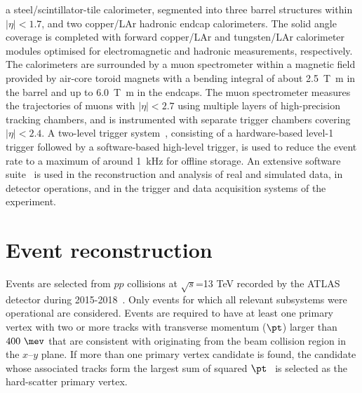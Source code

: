 \documentclass[PAPER, coverpage, atlasdraft=true, texlive=2016, UKenglish]{\ATLASLATEXPATH atlasdoc}
\providecommand{\DIFadd}[1]{{\protect\color{blue}\uwave{#1}}} %
\providecommand{\DIFaddbegin}{} %
\providecommand{\DIFaddend}{} %
\begin{document}
a steel/scintillator-tile calorimeter, segmented into three barrel structures within $|\eta| < 1.7$, and two copper/LAr hadronic endcap calorimeters.
The solid angle coverage is completed with forward copper/LAr and tungsten/LAr calorimeter modules optimised for electromagnetic and hadronic measurements, respectively.
The calorimeters are surrounded by a muon spectrometer within a magnetic field provided by air-core toroid magnets with a bending integral of about \SI{2.5}{\tesla\metre} in the barrel and up to \SI{6.0}{\tesla\metre} in the endcaps. 
The muon spectrometer measures the trajectories of muons with $|\eta|<2.7$ using multiple layers of high-precision tracking chambers, and \DIFaddbegin \DIFadd{it }\DIFaddend is instrumented with separate trigger chambers covering $|\eta|<2.4$. A two-level trigger system~\cite{Aaboud:2016leb}, consisting of a hardware-based level-1 trigger followed by a software-based high-level trigger, is used to reduce the event rate to a maximum of around \SI{1}{\kHz} for offline storage.
An extensive software suite~\cite{ATL-SOFT-PUB-2021-001} is used in the reconstruction and analysis of real and simulated data, in detector operations, and in the trigger and data acquisition systems of the experiment.


\section{Event reconstruction}
\label{sec:objects}

Events are selected from $pp$ collisions at $\sqrt{s}$=13 TeV recorded by the ATLAS detector during 2015-2018~\cite{DAPR-2018-01}.
Only events for which all relevant subsystems were operational are considered.
Events are required to have at least one primary vertex with two or more tracks with transverse momentum
($\pt$) larger than $400~\mev$ that are consistent with originating from the 
beam collision region in the $x$--$y$ plane. If more than one primary vertex candidate is found, the
candidate whose associated tracks form the largest sum of squared $\pt$~\cite{ATL-PHYS-PUB-2015-026}
is selected as the hard-scatter primary vertex.
\end{document}

